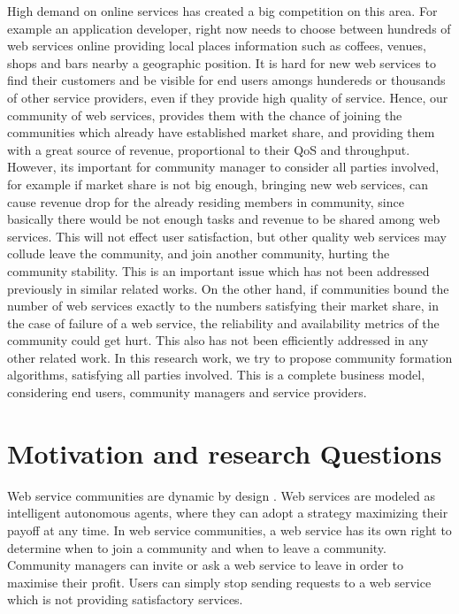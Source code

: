 High demand on online services has created a big competition on this area. For example an application developer, right now needs to choose between hundreds of web services online providing local places information such as coffees, venues, shops and bars nearby a geographic position. It is hard for new web services to find their customers and be visible for end users amongs hundereds or thousands of other service providers, even if they provide high quality of service. Hence, our community of web services, provides them with the chance of joining the communities which already have established market share, and providing them with a great source of revenue, proportional to their QoS and throughput. However, its important for community manager to consider all parties involved, for example if market share is not big enough, bringing
new web services, can cause revenue drop for the already residing members in community, since basically there would be not enough tasks and revenue to be shared among web services. This will not effect user satisfaction, but other quality web services may collude leave the community, and join another community, hurting the community stability. This is an important issue which has not been addressed previously in similar related works. On the other hand, if communities bound the number of web services exactly to the numbers satisfying their market share, in the case of failure of a web service, the reliability and availability metrics of the community could get hurt. This also has not been efficiently addressed in any other related work. In this research work, we try to propose community formation algorithms, satisfying all parties involved. This is a complete business model, considering end users, community managers and service providers.

\section{Motivation and research Questions}\label{sec:researchquestions}

Web service communities are dynamic by design \cite{DBLP:journals/ijebr/MaamarSTBB09}. Web services are modeled as intelligent autonomous agents, where they can adopt a strategy maximizing their payoff at any time. In web service communities, a web service has its own right to determine when to join a community and when to leave a community. Community managers can invite or ask a web service to leave in order to maximise their profit. Users can simply stop sending requests to a web service which is not providing satisfactory services.


